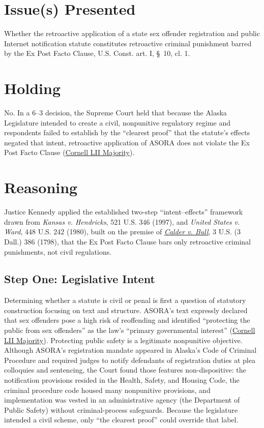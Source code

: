 \documentclass[12pt]{article}
\begin{document}
\section{Issue(s) Presented}
Whether the retroactive application of a state sex offender registration and public Internet notification statute constitutes retroactive criminal punishment barred by the Ex Post Facto Clause, U.S. Const. art. I, \S\ 10, cl. 1.

\section{Holding}
No. In a 6--3 decision, the Supreme Court held that because the Alaska Legislature intended to create a civil, nonpunitive regulatory regime and respondents failed to establish by the ``clearest proof'' that the statute's effects negated that intent, retroactive application of ASORA does not violate the Ex Post Facto Clause (\href{https://www.law.cornell.edu/supct/html/01-729.ZO.html}{Cornell LII Majority}).

\section{Reasoning}
Justice Kennedy applied the established two-step ``intent--effects'' framework drawn from \textit{Kansas v. Hendricks}, 521 U.S. 346 (1997), and \textit{United States v. Ward}, 448 U.S. 242 (1980), built on the premise of \href{https://supreme.justia.com/cases/federal/us/3/386/}{\textit{Calder v. Bull}}, 3 U.S. (3 Dall.) 386 (1798), that the Ex Post Facto Clause bars only retroactive criminal punishments, not civil regulations.

\subsection{Step One: Legislative Intent}
Determining whether a statute is civil or penal is first a question of statutory construction focusing on text and structure. ASORA's text expressly declared that sex offenders pose a high risk of reoffending and identified ``protecting the public from sex offenders'' as the law's ``primary governmental interest'' (\href{https://www.law.cornell.edu/supct/html/01-729.ZO.html}{Cornell LII Majority}). Protecting public safety is a legitimate nonpunitive objective. Although ASORA's registration mandate appeared in Alaska's Code of Criminal Procedure and required judges to notify defendants of registration duties at plea colloquies and sentencing, the Court found those features non-dispositive: the notification provisions resided in the Health, Safety, and Housing Code, the criminal procedure code housed many nonpunitive provisions, and implementation was vested in an administrative agency (the Department of Public Safety) without criminal-process safeguards. Because the legislature intended a civil scheme, only ``the clearest proof'' could override that label.
\end{document}
